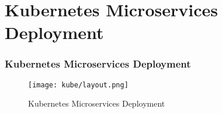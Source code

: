 \section{Kubernetes Microservices Deployment}

\begin{frame}
    \frametitle{Kubernetes Microservices Deployment}
    \begin{figure}
        \centering
        \texttt{[image: kube/layout.png]} %
        \caption{Kubernetes Microservices Deployment}
    \end{figure}
\end{frame}